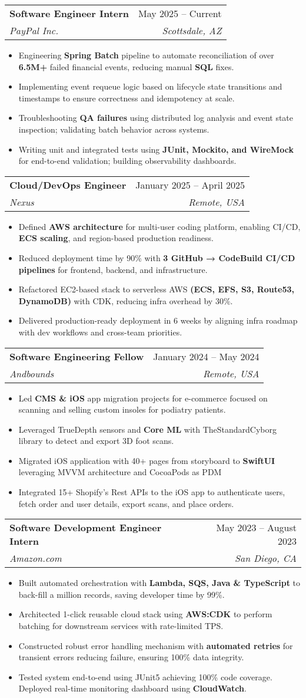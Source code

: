 \documentclass[letterpaper,11pt]{article}
\makeatletter
\newcommand{\resumeItem}[1]{
  \item\small{\fontsize{10}{11}\selectfont
    {#1 \vspace{-1pt}}
  }
}
\newcommand{\resumeSubheading}[4]{
  \vspace{-0pt}\item
    \begin{tabular*}{0.97\textwidth}[t]{l@{\extracolsep{\fill}}r}
      \textbf{#1} & #2 \\
      \textit{#3} & \textit{#4} \\ 
    \end{tabular*}\vspace{-6pt}
}
\newcommand{\resumeItemListStart}{\begin{itemize}[leftmargin=0.20in]}
\newcommand{\resumeItemListEnd}{\end{itemize}\vspace{-6pt}}
\makeatother
\begin{document}
    \resumeSubheading
    {Software Engineer Intern}{May 2025 -- Current}
    {PayPal Inc.}{Scottsdale, AZ}
    \resumeItemListStart
        \resumeItem{Engineering \textbf{Spring Batch} pipeline to automate reconciliation of over \textbf{6.5M+} failed financial events, reducing manual \textbf{SQL} fixes.}
        \resumeItem{Implementing event requeue logic based on lifecycle state transitions and timestamps to ensure correctness and idempotency at scale.}
        \resumeItem{Troubleshooting \textbf{QA failures} using distributed log analysis and event state inspection; validating batch behavior across systems.}
        \resumeItem{Writing unit and integrated tests using \textbf{JUnit, Mockito, and WireMock} for end-to-end validation; building observability dashboards.}
    \resumeItemListEnd
    
    \resumeSubheading
    {Cloud/DevOps Engineer}{January 2025 -- April 2025}
    {Nexus}{Remote, USA}
    \resumeItemListStart
        \resumeItem{Defined \textbf{AWS architecture} for multi-user coding platform, enabling CI/CD, \textbf{ECS scaling}, and region-based production readiness.}
        \resumeItem{Reduced deployment time by 90\% with \textbf{3 GitHub → CodeBuild CI/CD pipelines} for frontend, backend, and infrastructure.}
        \resumeItem{Refactored EC2-based stack to serverless AWS \textbf{(ECS, EFS, S3, Route53, DynamoDB)} with CDK, reducing infra overhead by 30\%.}
        \resumeItem{Delivered production-ready deployment in 6 weeks by aligning infra roadmap with dev workflows and cross-team priorities.}
    \resumeItemListEnd

    \resumeSubheading
    {Software Engineering Fellow}{January 2024 -- May 2024}
    {Andbounds}{Remote, USA}
    \resumeItemListStart
        \resumeItem{Led \textbf{CMS \& iOS} app migration projects for e-commerce focused on scanning and selling custom insoles for podiatry patients.}
        \resumeItem{Leveraged TrueDepth sensors and \textbf{Core ML} with TheStandardCyborg library to detect and export 3D foot scans.}
        \resumeItem{Migrated iOS application with 40+ pages from storyboard to \textbf{SwiftUI} leveraging MVVM architecture and CocoaPods as PDM}
        \resumeItem{Integrated 15+ Shopify's Rest APIs to the iOS app to authenticate users, fetch order and user details, export scans, and place orders.}
    \resumeItemListEnd
    
    \resumeSubheading
    {Software Development Engineer Intern}{May 2023 -- August 2023}
    {Amazon.com}{San Diego, CA}
    \resumeItemListStart
        \resumeItem{Built automated orchestration with \textbf{Lambda, SQS, Java \& TypeScript} to back-fill a million records, saving developer time by 99\%.}
        \resumeItem{Architected 1-click reusable cloud stack using \textbf{AWS:CDK} to perform batching for downstream services with rate-limited TPS.}
        \resumeItem{Constructed robust error handling mechanism with \textbf{automated retries} for transient errors reducing failure, ensuring 100\% data integrity.}
        \resumeItem{Tested system end-to-end using JUnit5 achieving 100\% code coverage. Deployed real-time monitoring dashboard using \textbf{CloudWatch}.}
    \resumeItemListEnd
    
\end{document}
